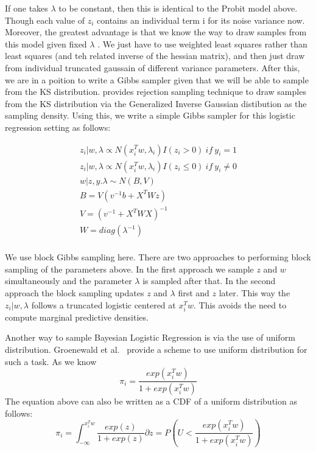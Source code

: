 If one takes $\lambda$ to be  constant, then this is identical to the
Probit model above. Though each value of $z_i$ contains an individual term i for
its noise variance now. Moreover, the greatest advantage is that we know the way
to draw samples from this model given fixed $\lambda$ . We just have to use
weighted least squares rather than least squares (and teh related inverse of the 
hessian matrix), and then just draw from individual truncated gaussain of
different variance parameters. After this, we are in a poition to write a
Gibbs sampler given that we will be able to sample from the KS distribution.
\cite{Holmes} provides rejection sampling technique to draw samples 
from the KS distribution via the Generalized Inverse Gaussian distibution as the
sampling density. Using this, we write a simple Gibbs sampler for this
logistic regression setting as follows:

\begin{eqnarray}
z_i|w,\lambda \propto N(x_i^Tw,\lambda_i)I(z_i>0)~if~y_i=1 \\
z_i|w,\lambda \propto N(x_i^Tw,\lambda_i)I(z_i\leq 0)~if~y_i\neq 0 \\
w|z,y.\lambda \sim N(B,V) \\
B = V(v^{-1}b+X^TWz) \\
V=(v^{-1}+X^TWX)^{-1} \\
W=diag(\lambda^{-1}) \\
\end{eqnarray}

We use block Gibbs sampling here. 
There are two approaches to performing block sampling of the parameters above.
In the first approach we sample $z$ and $w$ simultaneously and the parameter
$\lambda$ is sampled after that. In the second approach 
the block sampling updates $z$ and
$\lambda$ first and $z$ later. This way the $z_i|w,\lambda$ follows a
truncated logistic centered at $x_i^Tw$. This avoids the need to compute
marginal predictive densities.    

Another way to sample Bayesian Logistic Regression is via the use of uniform
distribution. Groenewald et al.~\cite{Groenewald2005} provide a scheme to
use uniform distribution for such a task. As we know 
\begin{equation}
\pi_i = \frac{exp(x_i^Tw)}{1+exp(x_i^Tw)}
\end{equation} 
The equation above can also be written as a CDF of a uniform distribution as
follows:
\begin{equation}
\pi_i = \int_{-\infty}^{x_i^Tw} \frac{exp(z)}{1+exp(z)} \partial z =
P(U<\frac{exp(x_i^Tw)}{1+exp(x_i^Tw)})
\label{eqn:uniformSample}
\end{equation}

